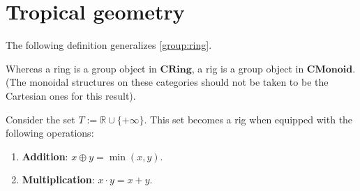 
\section{Tropical geometry}

    The following definition generalizes \cref{group:ring}.
    \begin{remark}
        Whereas a ring is a group object in $\mathbf{CRing}$, a rig is a group object in $\mathbf{CMonoid}$. (The monoidal structures on these categories should not be taken to be the Cartesian ones for this result).
    \end{remark}

    \begin{example}
        Consider the set $T:=\mathbb{R}\cup\{+\infty\}$. This set becomes a rig when equipped with the following operations:
        \begin{enumerate}
            \item\textbf{Addition}: $x\oplus y=\min(x,y)$.
            \item\textbf{Multiplication}: $x\cdot y=x+y$.
        \end{enumerate}
    \end{example}

